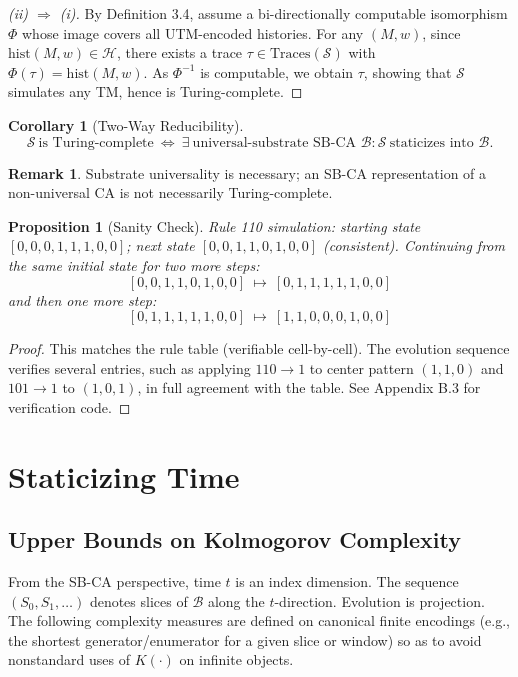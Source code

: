 \documentclass[12pt]{article}
\theoremstyle{plain}
\newtheorem{proposition}[theorem]{Proposition}
\newtheorem{corollary}[theorem]{Corollary}
\theoremstyle{definition}
\newtheorem{remark}[theorem]{Remark}
\begin{document}
\begin{proof}[(ii) $\Rightarrow$ (i)]
By Definition 3.4, assume a bi-directionally computable isomorphism $\Phi$ whose image covers all UTM-encoded histories. For any $(M,w)$, since $\mathrm{hist}(M,w)\in\mathcal{H}$, there exists a trace $\tau\in\mathrm{Traces}(\mathcal{S})$ with $\Phi(\tau)=\mathrm{hist}(M,w)$. As $\Phi^{-1}$ is computable, we obtain $\tau$, showing that $\mathcal{S}$ simulates any TM, hence is Turing-complete.
\end{proof}

\begin{corollary}[Two-Way Reducibility]
\[
\mathcal{S}\ \text{is Turing-complete}\ \Longleftrightarrow\ \exists\ \text{universal-substrate SB-CA } \mathcal{B} : \mathcal{S}\ \text{staticizes into } \mathcal{B}.
\]
\end{corollary}

\begin{remark}
Substrate universality is necessary; an SB-CA representation of a non-universal CA is not necessarily Turing-complete.
\end{remark}

\begin{proposition}[Sanity Check]
Rule 110 simulation: starting state $[0,0,0,1,1,1,0,0]$; next state $[0,0,1,1,0,1,0,0]$ (consistent). Continuing from the same initial state for two more steps:
\[
[0,0,1,1,0,1,0,0]\ \mapsto\ [0,1,1,1,1,1,0,0]
\]
and then one more step:
\[
[0,1,1,1,1,1,0,0]\ \mapsto\ [1,1,0,0,0,1,0,0]
\]
\end{proposition}

\begin{proof}
This matches the rule table (verifiable cell-by-cell). The evolution sequence verifies several entries, such as applying $110\to 1$ to center pattern $(1,1,0)$ and $101\to 1$ to $(1,0,1)$, in full agreement with the table. See Appendix B.3 for verification code.
\end{proof}

\section{Staticizing Time}

\subsection{Upper Bounds on Kolmogorov Complexity}

From the SB-CA perspective, time $t$ is an index dimension. The sequence $(S_0,S_1,\dots)$ denotes slices of $\mathcal{B}$ along the $t$-direction. Evolution is projection. The following complexity measures are defined on canonical finite encodings (e.g., the shortest generator/enumerator for a given slice or window) so as to avoid nonstandard uses of $K(\cdot)$ on infinite objects.
\end{document}
